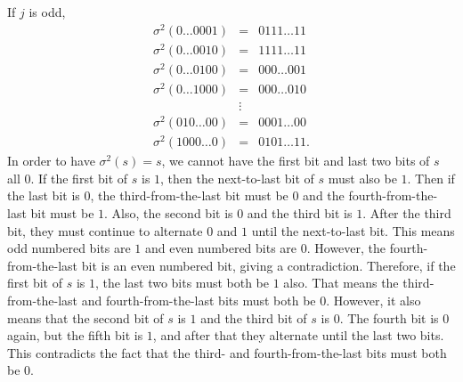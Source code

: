 \documentclass{report}
\begin{document}
If $j$ is odd,
\begin{eqnarray}
\sigma^2 (0 \ldots 0 0 0 1) & = & 0 1 1 1 \ldots 1 1  \nonumber \\
\sigma^2 (0 \ldots 0 0 1 0) & = & 1 1 1 1 \ldots 1 1 \nonumber \\
\sigma^2 (0 \ldots 0 1 0 0) & = & 0 0 0 \ldots 0 0 1 \nonumber \\
\sigma^2 (0 \ldots 1 0 0 0) & = & 0 0 0 \ldots 0 1 0 \\
& \vdots & \nonumber \\
\sigma^2 (0 1 0 \ldots 0 0) & = & 0 0 0 1 \ldots 0 0 \nonumber \\
\sigma^2 (1 0 0 0 \ldots 0) & = & 0 1 0 1 \ldots 1 1. \nonumber
\end{eqnarray}
In order to have $\sigma^2 (s) = s$, we cannot have the first bit and last 
two bits of $s$ all $0$.  If the first bit of $s$ is $1$, then the next-to-last 
bit of $s$ must also be $1$.  Then if the last bit is $0$, the
third-from-the-last bit must be $0$ and the fourth-from-the-last bit must 
be $1$.  Also, the second bit is $0$ and the third bit is $1$.  After the third 
bit, they must continue to alternate $0$ and $1$ until the next-to-last bit.  
This means odd numbered bits are $1$ and even numbered bits are $0$.  
However, the fourth-from-the-last bit is an even numbered bit, giving a 
contradiction.  Therefore, if the first bit of $s$ is $1$, the last two bits 
must both be $1$ also.  That means the third-from-the-last and
fourth-from-the-last bits must both be $0$.  However, it also means that 
the second bit of $s$ is $1$ and the third bit of $s$ is $0$.  The fourth bit 
is $0$ again, but the fifth bit is $1$, and after that they alternate until the 
last two bits.  This contradicts the fact that the third- and
fourth-from-the-last bits must both be $0$.
\end{document}
